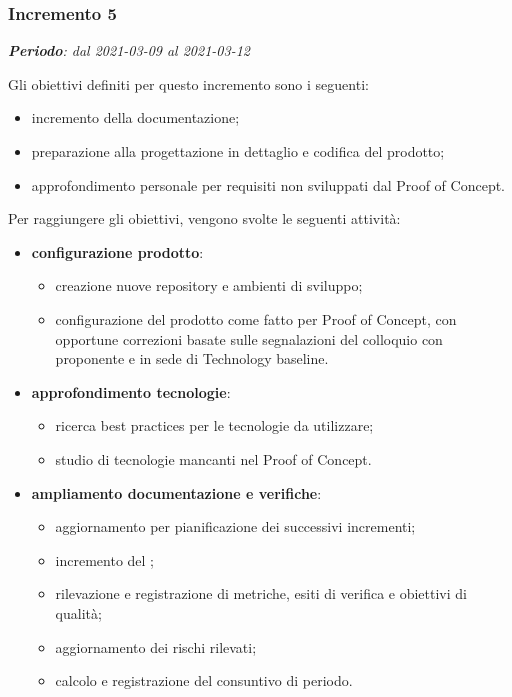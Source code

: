 \subsubsection{Incremento 5}
\textit{\textbf{Periodo}: dal 2021-03-09 al 2021-03-12}

Gli obiettivi definiti per questo incremento sono i seguenti:
\begin{itemize}
\item incremento della documentazione;
\item preparazione alla progettazione in dettaglio e codifica del prodotto;
\item approfondimento personale per requisiti non sviluppati dal Proof of Concept.
\end{itemize}

Per raggiungere gli obiettivi, vengono svolte le seguenti attività:
\begin{itemize}

\item \textbf{configurazione prodotto}:
\begin{itemize}
\item creazione nuove repository e ambienti di sviluppo;
\item configurazione del prodotto come fatto per Proof of Concept, con opportune correzioni basate sulle segnalazioni del colloquio con proponente e in sede di Technology baseline.
\end{itemize}

\item \textbf{approfondimento tecnologie}:
\begin{itemize}
\item ricerca best practices per le tecnologie da utilizzare;
\item studio di tecnologie mancanti nel Proof of Concept.
\end{itemize}

\item \textbf{ampliamento documentazione e verifiche}:
\begin{itemize}
\item aggiornamento  per pianificazione dei successivi incrementi;
\item incremento del ;
\item rilevazione e registrazione di metriche, esiti di verifica e obiettivi di qualità;
\item aggiornamento dei rischi rilevati;
\item calcolo e registrazione del consuntivo di periodo.
\end{itemize}

\end{itemize}

